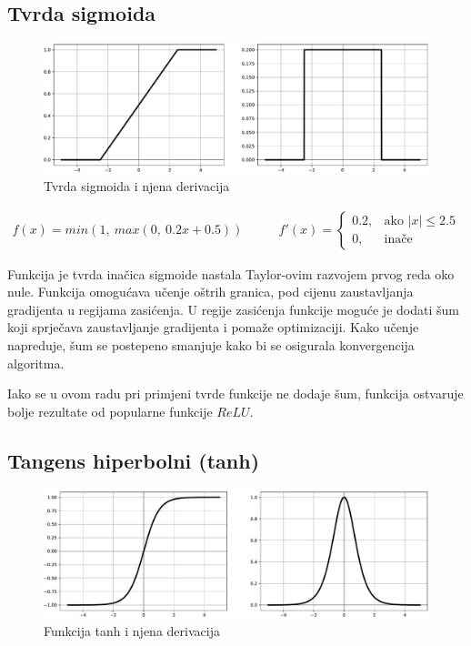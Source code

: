 \documentclass[times, utf8, numeric, diplomski]{fer}
\begin{document}
\subsection{Tvrda sigmoida}
\label{func:hard_sigmoid}

\begin{figure}[H]
\includegraphics[width=\textwidth]{func_Hard_sigmoid.pdf}
\centering
\caption{Tvrda sigmoida i njena derivacija}
\label{fig:hard_sigmoid}
\end{figure}

\begin{equation}
\label{eq:hsigmoid}
\begin{split}
f(x) = min(1,\ max(0,\ 0.2x + 0.5))
\end{split}
\qquad
\begin{split}
f'(x) = 
\begin{cases}
0.2,	 		& \text{ako } |x| \leq 2.5 \\
0,	& \text{inače}
\end{cases}
\end{split}
\end{equation}

Funkcija je tvrda inačica sigmoide nastala Taylor-ovim razvojem prvog reda oko nule. Funkcija omogućava učenje oštrih granica, pod cijenu zaustavljanja gradijenta u regijama zasićenja. U regije zasićenja funkcije moguće je dodati šum koji sprječava zaustavljanje gradijenta i pomaže optimizaciji. Kako učenje napreduje, šum se postepeno smanjuje kako bi se osigurala konvergencija algoritma. \citep{hardsigm}

Iako se u ovom radu pri primjeni tvrde funkcije ne dodaje šum, funkcija ostvaruje bolje rezultate od popularne funkcije $ReLU$.

\subsection{Tangens hiperbolni (tanh)}
\label{func:tanh}

\begin{figure}[H]
\includegraphics[width=\textwidth]{func_tanh.pdf}
\centering
\caption{Funkcija tanh i njena derivacija}
\label{fig:tanh}
\end{figure}
\end{document}
